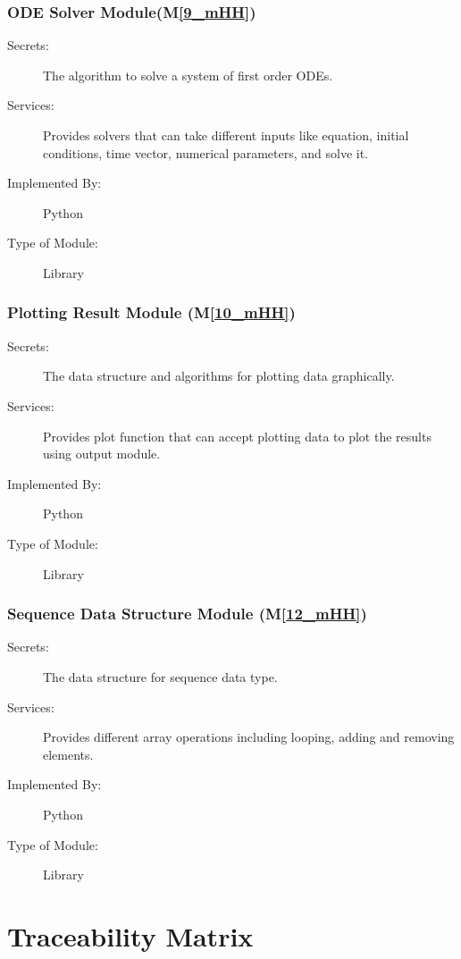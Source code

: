 \documentclass[12pt, titlepage]{article}
\newcommand{\mref}[1]{M\ref{#1}}
\begin{document}
\subsubsection{ODE Solver Module(\mref{9_mHH})}

\begin{description}
\item[Secrets:]The algorithm to solve a system of first order ODEs. 
\item[Services:] Provides solvers that can take different inputs like equation, initial conditions, time vector, numerical parameters, and solve it.  
\item[Implemented By:] Python
\item[Type of Module:] Library
\end{description}

\subsubsection{Plotting Result Module (\mref{10_mHH})}

\begin{description}
\item[Secrets:] The data structure and algorithms for plotting data graphically. 
\item[Services:] Provides plot function that can accept plotting data to plot the results using output module. 
\item[Implemented By:] Python
\item[Type of Module:] Library
\end{description}

\subsubsection{Sequence Data Structure Module (\mref{12_mHH})}

\begin{description}
\item[Secrets:] The data structure for sequence data type. 
\item[Services:] Provides different array operations including looping, adding and removing elements. 
\item[Implemented By:] Python
\item[Type of Module:] Library
\end{description}


\section{Traceability Matrix} \label{SecTM}
\end{document}
